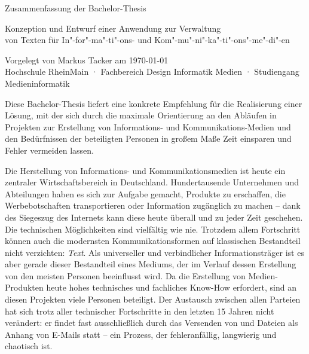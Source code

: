 \documentclass[11pt,a4paper]{article}
\begin{document}
\setmainfont[Mapping=tex-text]{Museo Sans}

\begin{center}
Zusammenfassung der Bachelor-Thesis\\
\begin{large}
Konzeption und Entwurf einer Anwendung zur Verwaltung\\von Texten für In"-for"-ma"-ti"-ons- und Kom"-mu"-ni"-ka"-ti"-ons"-me"-di"-en\\
\end{large}
\bigskip
\begin{tiny}
Vorgelegt von Markus Tacker am \today\\
Hochschule RheinMain · Fachbereich Design Informatik Medien · Studiengang Medieninformatik\\
\end{tiny}
\end{center}

\setmainfont[Mapping=tex-text,BoldFont={Vollkorn-Bold},ItalicFont={Vollkorn-Italic},BoldItalicFont={Vollkorn-Bold Italic}]{Vollkorn}
\setsansfont[Mapping=tex-text]{Museo Sans}

Diese Bachelor-Thesis liefert eine konkrete Empfehlung für die Realisierung einer Lösung, mit der sich durch die maximale Orientierung an den Abläufen in Projekten zur Erstellung von Informations- und Kommunikations-Medien und den Bedürfnissen der beteiligten Personen in großem Maße Zeit einsparen und Fehler vermeiden lassen.

\secbar

Die Herstellung von Informations- und Kommunikationsmedien ist heute ein zentraler Wirtschaftsbereich in Deutschland. Hundertausende Unternehmen und Abteilungen haben es sich zur Aufgabe gemacht, Produkte zu erschaffen, die Werbebotschaften transportieren oder Information zugänglich zu machen -- dank des Siegeszug des Internets kann diese heute überall und zu jeder Zeit geschehen. Die technischen Möglichkeiten sind vielfältig wie nie. Trotzdem allem Fortschritt können auch die modernsten Kommunikationsformen auf klassischen Bestandteil nicht verzichten: \emph{Text}. Als universeller und verbindlicher Informationsträger ist es aber gerade dieser Bestandteil eines Mediums, der im Verlauf dessen Erstellung von den meisten Personen beeinflusst wird. Da die Erstellung von Medien-Produkten heute hohes technisches und fachliches Know-How erfordert, sind an diesen Projekten viele Personen beteiligt. Der Austausch zwischen allen Parteien hat sich trotz aller technischer Fortschritte in den letzten 15 Jahren nicht verändert: er findet fast ausschließlich durch das Versenden von  und Dateien als Anhang von E-Mails statt -- ein Prozess, der fehleranfällig, langwierig und chaotisch ist. 
\end{document}
